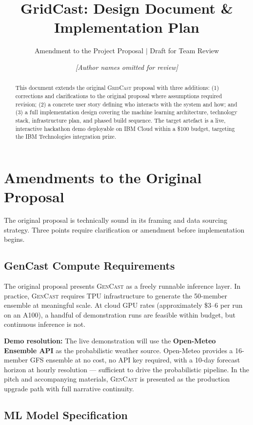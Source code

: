 \documentclass[10pt,letterpaper]{article}
\title{GridCast: Design Document \& Implementation Plan}
\subtitle{Amendment to the Project Proposal $\vert$ Draft for Team Review}
\author{%
  \textit{[Author names omitted for review]}
}
\date{}
\newcommand{\gridcast}{\textsc{GridCast}\xspace}
\newcommand{\gencast}{\textsc{GenCast}\xspace}
\begin{document}
\maketitle

\begin{abstract}
This document extends the original \gridcast proposal with three additions: (1) corrections
and clarifications to the original proposal where assumptions required revision; (2) a
concrete user story defining who interacts with the system and how; and (3) a full
implementation design covering the machine learning architecture, technology stack,
infrastructure plan, and phased build sequence. The target artefact is a live,
interactive hackathon demo deployable on IBM Cloud within a \$100 budget, targeting
the IBM Technologies integration prize.
\end{abstract}

\section{Amendments to the Original Proposal}

The original proposal is technically sound in its framing and data sourcing strategy.
Three points require clarification or amendment before implementation begins.

\subsection{GenCast Compute Requirements}

The original proposal presents \gencast as a freely runnable inference layer.
In practice, \gencast requires TPU infrastructure to generate the 50-member ensemble at
meaningful scale. At cloud GPU rates (approximately \$3--6 per run on an A100), a handful
of demonstration runs are feasible within budget, but continuous inference is not.

\textbf{Demo resolution:} The live demonstration will use the
\textbf{Open-Meteo Ensemble API} as the probabilistic weather source. Open-Meteo provides
a 16-member GFS ensemble at no cost, no API key required, with a 10-day forecast horizon
at hourly resolution --- sufficient to drive the probabilistic pipeline. In the pitch and
accompanying materials, \gencast is presented as the production upgrade path with full
narrative continuity.

\subsection{ML Model Specification}
\end{document}
